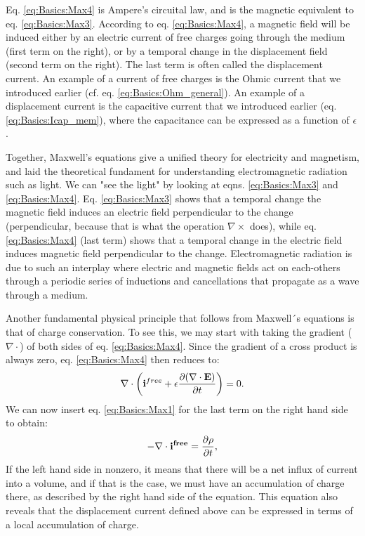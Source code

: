 Eq.  \ref{eq:Basics:Max4} is Ampere's circuital law, and is the magnetic equivalent to eq. \ref{eq:Basics:Max3}. According to eq. \ref{eq:Basics:Max4}, a magnetic field will be induced either by an electric current of free charges going through the medium (first term on the right), or by a temporal change in the displacement field (second term on the right). The last term is often called the displacement current. An example of a current of free charges is the Ohmic current that we introduced earlier (cf. eq. \ref{eq:Basics:Ohm_general}). An example of a displacement current is the capacitive current that we introduced earlier (eq. \ref{eq:Basics:Icap_mem}), where the capacitance can be expressed as a function of $\epsilon$. 

Together, Maxwell's equations give a unified theory for electricity and magnetism, and laid the theoretical fundament for understanding electromagnetic radiation such as light. We can "see the light" by looking at eqns. \ref{eq:Basics:Max3} and \ref{eq:Basics:Max4}. Eq. \ref{eq:Basics:Max3} shows that a temporal change the magnetic field induces an electric field perpendicular to the change (perpendicular, because that is what the operation $\nabla \times$ does), while eq. \ref{eq:Basics:Max4} (last term) shows that a temporal change in the electric field induces magnetic field perpendicular to the change. Electromagnetic radiation is due to such an interplay where electric and magnetic fields act on each-others through a periodic series of inductions and cancellations that propagate as a wave through a medium. 

Another fundamental physical principle that follows from Maxwell´s equations is that of charge conservation. To see this, we may start with taking the gradient ($\nabla \cdot$) of both sides of eq. \ref{eq:Basics:Max4}. Since the gradient of a cross product is always zero, eq. \ref{eq:Basics:Max4} then reduces to:
\begin{equation}
\nabla \cdot \left( {\bf i}^{free} +  \epsilon \frac{\partial (\nabla \cdot {\bf E})}{\partial t} \right) = 0.
\label{eq:Basics:Max4dot}
\end{equation}
We can now insert eq. \ref{eq:Basics:Max1} for the last term on the right hand side to obtain:
\begin{equation}
- \nabla \cdot {\bf i^{free}} =  \frac{\partial \rho}{\partial t},
\label{eq:Basics:Max4dot1}
\end{equation}
If the left hand side in nonzero, it means that there will be a net influx of current into a volume, and if that is the case, we must have an accumulation of charge there, as described by the right hand side of the equation. This equation also reveals that the displacement current defined above can be expressed in terms of a local accumulation of charge.



